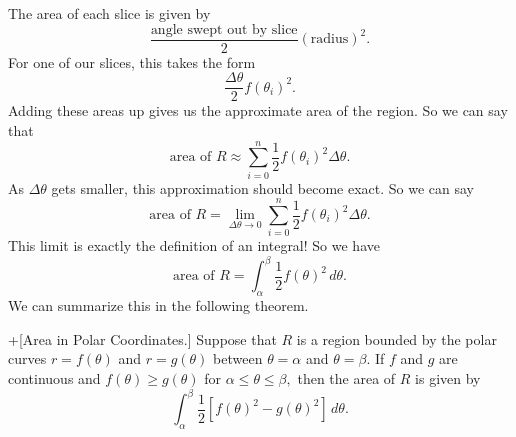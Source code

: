 \documentclass[10pt,]{book}
\theoremstyle{ptxplainnotitle}
\theoremstyle{ptxplaintitle}
\theoremstyle{ptxplainnotitle}
\theoremstyle{ptxplaintitle}
\theoremstyle{ptxplainnotitle}
\theoremstyle{ptxplaintitle}
\theoremstyle{ptxdefinitionnotitle}
\theoremstyle{ptxdefinitiontitle}
\theoremstyle{ptxdefinitionnotitle}
\theoremstyle{ptxdefinitiontitle}
\theoremstyle{ptxdefinitionnotitle}
\theoremstyle{ptxdefinitiontitle}
\theoremstyle{ptxdefinitionnotitle}
\theoremstyle{ptxdefinitiontitle}
\theoremstyle{ptxdefinitionnotitle}
\theoremstyle{ptxdefinitiontitle}
\numberwithin{equation}{section}
\begin{document}
\hypertarget{p-698}{}%
The area of each slice is given by%
%
\begin{equation*}
\frac{\text{angle swept out by slice}}{2}(\text{radius})^{2}.
\end{equation*}
\hypertarget{p-699}{}%
For one of our slices, this takes the form%
%
\begin{equation*}
\frac{\Delta\theta}{2}f(\theta_{i})^{2}.
\end{equation*}
\hypertarget{p-700}{}%
Adding these areas up gives us the approximate area of the region. So we can say that%
%
\begin{equation*}
\text{area of }R \approx \sum_{i=0}^{n}\frac{1}{2}f(\theta_{i})^{2}\Delta\theta.
\end{equation*}
\hypertarget{p-701}{}%
As \(\Delta\theta\) gets smaller, this approximation should become exact. So we can say%
%
\begin{equation*}
\text{area of }R = \lim_{\Delta\theta\to0}\sum_{i=0}^{n}\frac{1}{2}f(\theta_{i})^{2}\Delta\theta.
\end{equation*}
\hypertarget{p-702}{}%
This limit is exactly the definition of an integral! So we have%
%
\begin{equation*}
\text{area of }R = \int_{\alpha}^{\beta}\frac{1}{2}f(\theta)^{2}\,d\theta.
\end{equation*}
\hypertarget{p-703}{}%
We can summarize this in the following theorem.%
\begin{theorem}+[{Area in Polar Coordinates.}]\label{theorem-area-in-polar-coordinates}
\hypertarget{p-704}{}%
Suppose that \(R\) is a region bounded by the polar curves \(r=f(\theta)\) and \(r=g(\theta)\) between \(\theta = \alpha\) and \(\theta=\beta\). If \(f\) and \(g\) are continuous and \(f(\theta)\geq g(\theta)\) for \(\alpha\leq\theta\leq\beta,\) then the area of \(R\) is given by%
\begin{equation*}
\int_{\alpha}^{\beta}\frac{1}{2}[f(\theta)^{2}-g(\theta)^{2}]\,d\theta.
\end{equation*}
%
\end{theorem}
\end{document}

